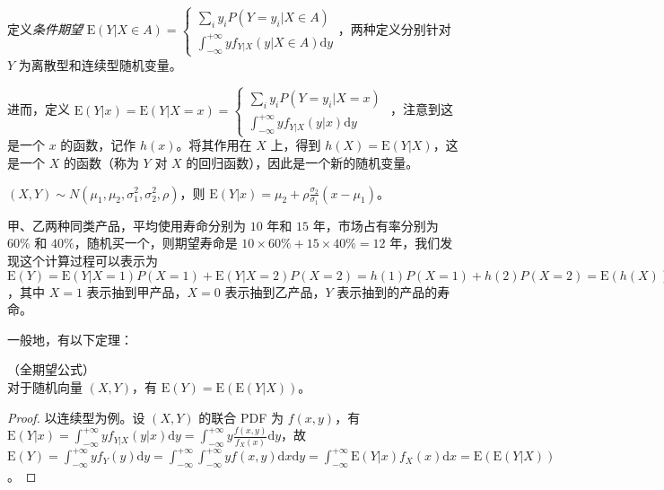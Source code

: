\documentclass[../main.tex]{subfiles}
\begin{document}
定义\emph{条件期望} $\mathrm E(Y|X\in A)=\left\{
    \begin{aligned}
        \sum_iy_iP(Y=y_i|X\in A) \\
        \int_{-\infty}^{+\infty}yf_{Y|X}(y|X\in A)\mathrm dy
    \end{aligned}\right.$，两种定义分别针对 $Y$ 为离散型和连续型随机变量。

进而，定义 $\mathrm E(Y|x)=\mathrm E(Y|X=x)=\left\{
    \begin{aligned}
        \sum_iy_iP(Y=y_i|X=x) \\
        \int_{-\infty}^{+\infty}yf_{Y|X}(y|x)\mathrm dy
    \end{aligned}\right.$
，注意到这是一个 $x$ 的函数，记作 $h(x)$。将其作用在 $X$ 上，得到 $h(X)=\mathrm E(Y|X)$，这是一个 $X$ 的函数（称为 $Y$ 对 $X$ 的回归函数），因此是一个新的随机变量。

\begin{example}
    $(X,Y)\sim N(\mu_1,\mu_2,\sigma_1^2,\sigma_2^2,\rho)$，则 $\mathrm E(Y|x)=\mu_2+\rho\frac{\sigma_2}{\sigma_1}(x-\mu_1)$。
\end{example}

\begin{example}
    甲、乙两种同类产品，平均使用寿命分别为 $10$ 年和 $15$ 年，市场占有率分别为 $60\%$ 和 $40\%$，随机买一个，则期望寿命是 $10\times 60\%+15\times 40\%=12$ 年，我们发现这个计算过程可以表示为 $\mathrm E(Y)=\mathrm E(Y|X=1)P(X=1)+\mathrm E(Y|X=2)P(X=2)=h(1)P(X=1)+h(2)P(X=2)=\mathrm E(h(X))=\mathrm E(\mathrm E(Y|X))$，其中 $X=1$ 表示抽到甲产品，$X=0$ 表示抽到乙产品，$Y$ 表示抽到的产品的寿命。
\end{example}

一般地，有以下定理：

\begin{theorem}\label{thm:4.7.1}
    （全期望公式）\\
    对于随机向量 $(X,Y)$，有 $\mathrm E(Y)=\mathrm E(\mathrm E(Y|X))$。
\end{theorem}

\begin{proof}
    以连续型为例。设 $(X,Y)$ 的联合 PDF 为 $f(x,y)$，有 $\mathrm E(Y|x)=\int_{-\infty}^{+\infty}yf_{Y|X}(y|x)\mathrm dy=\int_{-\infty}^{+\infty}y\frac{f(x,y)}{f_X(x)}\mathrm dy$，故 $\mathrm E(Y)=\int_{-\infty}^{+\infty}yf_Y(y)\mathrm dy=\int_{-\infty}^{+\infty}\int_{-\infty}^{+\infty}yf(x,y)\mathrm dx\mathrm dy=\int_{-\infty}^{+\infty}\mathrm E(Y|x)f_X(x)\mathrm dx=\mathrm E(\mathrm E(Y|X))$。
\end{proof}
\end{document}
